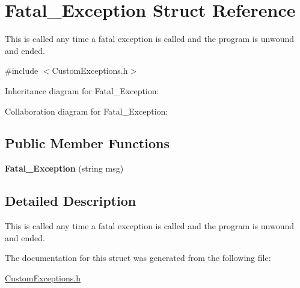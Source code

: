 \hypertarget{struct_fatal___exception}{}\section{Fatal\+\_\+\+Exception Struct Reference}
\label{struct_fatal___exception}


This is called any time a fatal exception is called and the program is unwound and ended.  




{\ttfamily \#include $<$Custom\+Exceptions.\+h$>$}



Inheritance diagram for Fatal\+\_\+\+Exception\+:


Collaboration diagram for Fatal\+\_\+\+Exception\+:
\subsection*{Public Member Functions}
\begin{DoxyCompactItemize}
\item 
{\bfseries Fatal\+\_\+\+Exception} (string msg)\hypertarget{struct_fatal___exception_ab288be87b35a7efa13bd7f1eca94f28a}{}\label{struct_fatal___exception_ab288be87b35a7efa13bd7f1eca94f28a}

\end{DoxyCompactItemize}


\subsection{Detailed Description}
This is called any time a fatal exception is called and the program is unwound and ended. 

The documentation for this struct was generated from the following file\+:\begin{DoxyCompactItemize}
\item 
\hyperlink{_custom_exceptions_8h}{Custom\+Exceptions.\+h}\end{DoxyCompactItemize}
